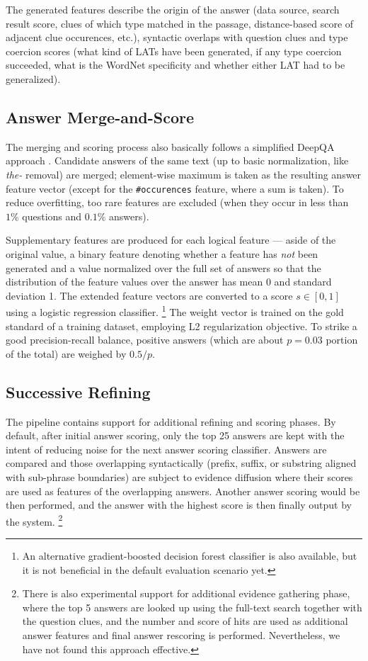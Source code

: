 The generated features describe the origin of the answer (data source, search result score, clues of which type matched in the passage, distance-based score of adjacent clue occurences, etc.), syntactic overlaps with question clues and type coercion scores (what kind of LATs have been generated, if any type coercion succeeded, what is the WordNet specificity and whether either LAT had to be generalized).

\subsection{Answer Merge-and-Score}

The merging and scoring process also basically follows a simplified DeepQA approach \citep{WatsonScoring}.
Candidate answers of the same text (up to basic normalization, like \textit{the-} removal) are merged;
element-wise maximum is taken as the resulting answer feature vector
(except for the \texttt{\#occurences} feature, where a sum is taken).
To reduce overfitting, too rare features are excluded
(when they occur in less than $1\%$ questions and $0.1\%$ answers).

Supplementary features are produced for each logical feature --- aside of the original value,
a binary feature denoting whether a feature has \textit{not} been generated
and a value normalized over the full set of answers
so that the distribution of the feature values over the answer
has mean 0 and standard deviation 1.
The extended feature vectors are converted to a score $s \in [0,1]$
using a logistic regression classifier.%
\footnote{An alternative gradient-boosted decision forest classifier is also
	available, but it is not beneficial in the default evaluation scenario yet.}
The weight vector is trained on the gold standard of a training dataset,
employing L2 regularization objective.  To strike a good precision-recall
balance, positive answers (which are about $p=0.03$ portion of the total)
are weighed by $0.5/p$.

\subsection{Successive Refining}

The pipeline contains support for additional refining and scoring phases.
By default, after initial answer scoring,
only the top 25 answers are kept with the intent of reducing noise for the next answer scoring classifier.
Answers are compared and those overlapping syntactically (prefix, suffix, or substring aligned with sub-phrase boundaries)
are subject to evidence diffusion where their scores are used as features of the overlapping answers.
Another answer scoring would be then performed, and the answer with the highest score is then finally output by the system.%
\footnote{There is also experimental support for additional evidence gathering phase, where the top 5 answers are looked up using the full-text search together with the question clues, and the number and score of hits are used as additional answer features and final answer rescoring is performed.  Nevertheless, we have not found this approach effective.}

